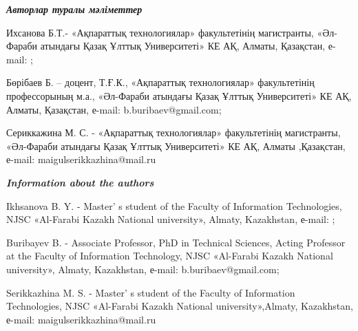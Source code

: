 \begin{authorinfo}
\emph{{\bfseries Авторлар туралы мәліметтер}}

Ихсанова Б.Т.- «Ақпараттық технологиялар» факультетінің магистранты,
«Әл-Фараби атындағы Қазақ Ұлттық Университеті» КЕ АҚ, Алматы, Қазақстан,
е-mail:
\href{mailto:botagozikhsanova@gmail.com}{};

\href{https://orcid.org/0009-0007-9202-9650}{}

Бөрібаев Б. -- доцент, Т.Ғ.К., «Ақпараттық технологиялар» факультетінің
профессорының м.а., «Әл-Фараби атындағы Қазақ Ұлттық Университеті» КЕ
АҚ, Алматы, Қазақстан, е-mail: b.buribaev@gmail.com;

\href{https://orcid.org/0009-0004-8866-9581}{}

Сериккажина М. С. - «Ақпараттық технологиялар» факультетінің
магистранты, «Әл-Фараби атындағы Қазақ Ұлттық Университеті» КЕ АҚ,
Алматы ,Қазақстан, е-mail: maigulserikkazhina@mail.ru

\href{https://orcid.org/0009-0001-0280-3099}{}

\emph{{\bfseries Information about the authors}}

Ikhsanova B. Y. - Master' s student of the Faculty of
Information Technologies, NJSC «Al-Farabi Kazakh National university»,
Almaty, Kazakhstan, е-mail:
\href{mailto:botagozikhsanova@gmail.com}{};

Buribayev B. - Associate Professor, PhD in Technical Sciences, Acting
Professor at the Faculty of Information Technology, NJSC «Al-Farabi
Kazakh National university», Almaty, Kazakhstan, е-mail:
b.buribaev@gmail.com;

Serikkazhina M. S. - Master' s student of the Faculty of
Information Technologies, NJSC «Al-Farabi Kazakh National
university»,Almaty, Kazakhstan, е-mail: maigulserikkazhina@mail.ru\
\end{authorinfo}
